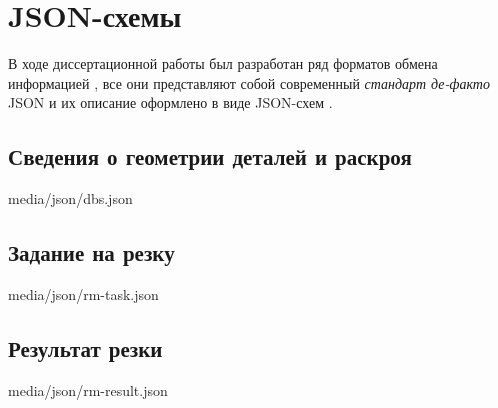 
\chapter{
  JSON-схемы
}
\label{app:json}

В ходе диссертационной работы был
разработан ряд форматов обмена информацией
\cite{bi:dbs-schema},
все они представляют собой современный
\textit{стандарт де-факто}
JSON
\cite{bi:JSON}
и их описание оформлено в виде
JSON-схем
\cite{bi:json-schema}.

\section{Сведения о геометрии деталей и раскроя}


{media/json/dbs.json}

\section{Задание на резку}


{media/json/rm-task.json}

\section{Результат резки}


{media/json/rm-result.json}
